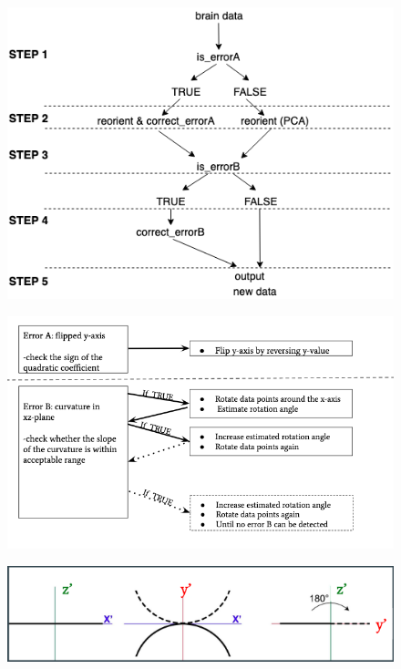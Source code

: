 \documentclass[10pt,letterpaper]{article}
\begin{document}
\begin{figure}[H]
\includegraphics[width=0.9\linewidth]{visualization_paper/cranium_procedure} \end{figure}

\begin{figure}[H]
\includegraphics[width=0.9\linewidth]{visualization_paper/diagram_2errors} \end{figure}

\begin{figure}[H]
\includegraphics[width=0.9\linewidth]{visualization_paper/error_correctionA} \end{figure}
\end{document}
